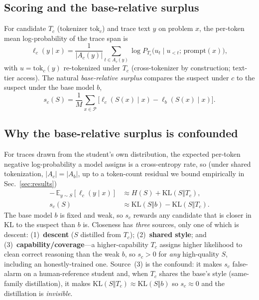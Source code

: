 \documentclass[journal]{IEEEtran}
\begin{document}
\subsection{Scoring and the base-relative surplus}
\label{sec:method:stat}
For candidate $T_c$ (tokenizer $\mathrm{tok}_c$) and trace text $y$ on problem $x$,
the per-token mean log-probability of the trace span is
\begin{equation}
\ell_c(y \mid x)=\frac{1}{|A_c(y)|}\sum_{t\in A_c(y)}
  \log P_{T_c}\!\big(u_t \mid u_{<t};\, \mathrm{prompt}(x)\big),
\label{eq:scorelp}
\end{equation}
with $u=\mathrm{tok}_c(y)$ re-tokenized under $T_c$ (cross-tokenizer by construction;
text-tier access). The natural \emph{base-relative surplus} compares the suspect under
$c$ to the suspect under the base model $b$,
\begin{equation}
s_c(S)=\frac{1}{M}\sum_{x\in\mathcal{P}}\big[\ell_c(S(x)\mid x)-\ell_b(S(x)\mid x)\big].
\label{eq:surplus}
\end{equation}

\subsection{Why the base-relative surplus is confounded}
\label{sec:method:decomp}
For traces drawn from the student's own distribution, the expected per-token negative
log-probability a model assigns is a cross-entropy rate, so (under shared
tokenization, $|A_c|\!=\!|A_b|$, up to a token-count residual we bound empirically in
Sec.~\ref{sec:results})
\begin{equation}
\begin{aligned}
-\,\mathbb{E}_{y\sim S}[\ell_c(y\mid x)]
&\approx H(S)+\mathrm{KL}(S\Vert T_c),\\
s_c(S)
&\approx \mathrm{KL}(S\Vert b)-\mathrm{KL}(S\Vert T_c).
\end{aligned}
\label{eq:klgap}
\end{equation}
The base model $b$ is fixed and weak, so $s_c$ rewards any candidate that is closer in
KL to the suspect than $b$ is. Closeness has \emph{three} sources, only one of which is
descent: (1)~\textbf{descent} ($S$ distilled from $T_c$); (2)~\textbf{shared style};
and (3)~\textbf{capability/coverage}---a higher-capability $T_c$ assigns higher
likelihood to clean correct reasoning than the weak $b$, so $s_c>0$ for \emph{any}
high-quality $S$, including an honestly-trained one. Source~(3) is the confound: it
makes $s_c$ false-alarm on a human-reference student and, when $T_c$ shares the base's
style (same-family distillation), it makes $\mathrm{KL}(S\Vert T_c)\!\approx\!
\mathrm{KL}(S\Vert b)$ so $s_c\!\approx\!0$ and the distillation is \emph{invisible}.
\end{document}
